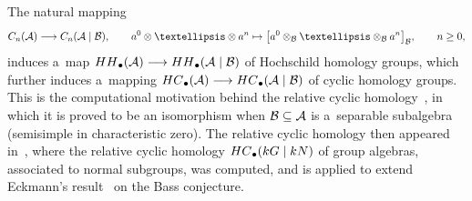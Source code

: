 \documentclass[11pt]{article}
\numberwithin{equation}{section}
\begin{document}
The natural mapping
\begin{gather*}
{\rm C}_n({\cal A})\longrightarrow {\rm C}_n({\cal A}\mid{\cal B}),
\qquad
a^0\otimes\dots\otimes a^n\mapsto \big[a^0\otimes_{\cal B} \dots \otimes_{\cal B} a^n\big]_{{\cal B}},
\qquad
n\geq 0,
\end{gather*}
induces a~map ${\rm HH}_\bullet({\cal A})\longrightarrow {\rm HH}_\bullet({\cal A}\mid{\cal B})$ of Hochschild homology
groups, which further induces a~mapping ${\rm HC}_\bullet({\cal A})\longrightarrow {\rm HC}_\bullet({\cal A}\mid{\cal
B})$ of cyclic homology groups.
This is the computational motivation behind the relative cyclic homology~\cite{Kadi92}, in which it is proved to be an
isomorphism when ${\cal B}\subseteq {\cal A}$ is a~separable subalgebra (semisimple in characteristic zero).
The relative cyclic homology then appeared in~\cite{Scha92}, where the relative cyclic homology ${\rm HC}_\bullet(kG\mid kN)$
of group algebras, associated to normal subgroups, was computed, and is applied to extend Eckmann's
result~\cite{Eckm86} on the Bass conjecture.
\end{document}
